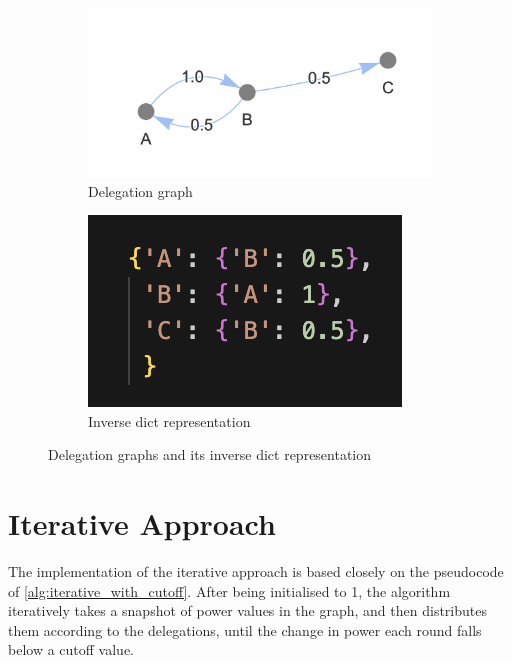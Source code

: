 \begin{figure}[t]
    \centering
    \begin{subfigure}[t]{0.45\textwidth}
        \centering
        \includegraphics[width=\textwidth]{small_cycle_graph}
        \caption{Delegation graph}
    \end{subfigure}
    \hfill
    \begin{subfigure}[t]{0.45\textwidth}
        \centering
        \includegraphics[width=\textwidth]{small_cycle_graph_inverse_dict}
        \caption{Inverse dict representation}
    \end{subfigure}
    \caption{Delegation graphs and its inverse dict representation}
    \label{fig:inverse_dict_example}
\end{figure}



\section{Iterative Approach}

The implementation of the iterative approach is based closely on the pseudocode of \cref{alg:iterative_with_cutoff}. After being initialised to 1, the algorithm iteratively takes a snapshot of power values in the graph, and then distributes them according to the delegations, until the change in power each round falls below a cutoff value. 

